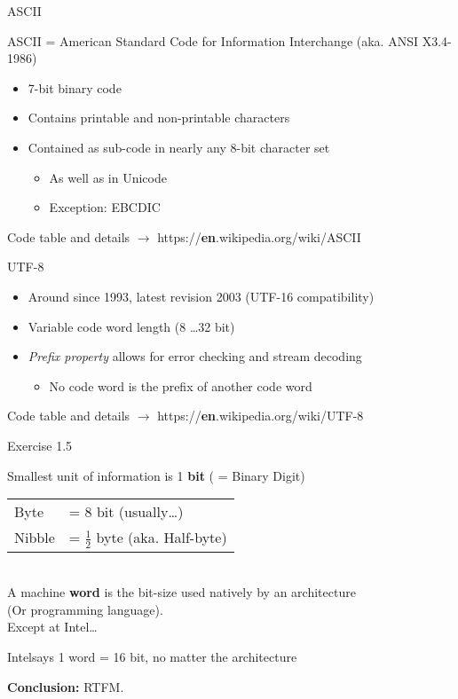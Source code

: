 \documentclass[11pt]{tudbeamer}
\begin{document}
\begin{frame}{ASCII}

	ASCII = American Standard Code for Information Interchange (aka. ANSI X3.4-1986)
	
	\begin{itemize}
		\item 7-bit binary code
		\item Contains printable and non-printable characters
		\item Contained as sub-code in nearly any 8-bit character set
		\begin{itemize}
			\item As well as in Unicode
			\item Exception: EBCDIC
		\end{itemize}
	\end{itemize}
	
	Code table and details $\rightarrow$ https://\textbf{en}.wikipedia.org/wiki/ASCII

\end{frame}

\begin{frame}{UTF-8}

	\begin{itemize}
		\item Around since 1993, latest revision 2003 (UTF-16 compatibility)
		\item Variable code word length (8 \dots 32 bit)
		\item \textit{Prefix property} allows for error checking and stream decoding
		\begin{itemize}
			\item No code word is the prefix of another code word
		\end{itemize}
	\end{itemize}
	
	Code table and details $\rightarrow$ https://\textbf{en}.wikipedia.org/wiki/UTF-8

\end{frame}

\begin{frame}{Exercise 1.5}
\centering

	Smallest unit of information is 1 \textbf{bit} ( = Binary Digit)
	
	\begin{tabular}{ll}
		Byte 	& = 8 bit (usually\dots) \\
		Nibble 	& = $\frac{1}{2}$ byte (aka. Half-byte) \\
	\end{tabular}
	\vspace{1em}\\
		A machine \textbf{word} is the bit-size used natively by an architecture \\
		(Or programming language). \\
		Except at Intel\texttrademark \dots
	
	\begin{block}{Intel\texttrademark says}
		1 word = 16 bit, no matter the architecture
	\end{block}
	
	\textbf{Conclusion:} RTFM.

\end{frame}
\end{document}
